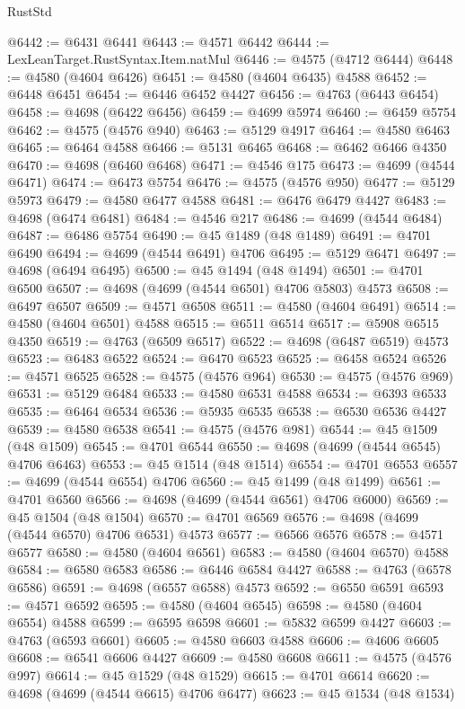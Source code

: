 \begin{lexlean}{RustStd}
\begin{coremodule}
@6442 := @6431 @6441
@6443 := @4571 @6442
@6444 := LexLeanTarget.RustSyntax.Item.natMul
@6446 := @4575 (@4712 @6444)
@6448 := @4580 (@4604 @6426)
@6451 := @4580 (@4604 @6435) @4588
@6452 := @6448 @6451
@6454 := @6446 @6452 @4427
@6456 := @4763 (@6443 @6454)
@6458 := @4698 (@6422 @6456)
@6459 := @4699 @5974
@6460 := @6459 @5754
@6462 := @4575 (@4576 @940)
@6463 := @5129 @4917
@6464 := @4580 @6463
@6465 := @6464 @4588
@6466 := @5131 @6465
@6468 := @6462 @6466 @4350
@6470 := @4698 (@6460 @6468)
@6471 := @4546 @175
@6473 := @4699 (@4544 @6471)
@6474 := @6473 @5754
@6476 := @4575 (@4576 @950)
@6477 := @5129 @5973
@6479 := @4580 @6477 @4588
@6481 := @6476 @6479 @4427
@6483 := @4698 (@6474 @6481)
@6484 := @4546 @217
@6486 := @4699 (@4544 @6484)
@6487 := @6486 @5754
@6490 := @45 @1489 (@48 @1489)
@6491 := @4701 @6490
@6494 := @4699 (@4544 @6491) @4706
@6495 := @5129 @6471
@6497 := @4698 (@6494 @6495)
@6500 := @45 @1494 (@48 @1494)
@6501 := @4701 @6500
@6507 := @4698 (@4699 (@4544 @6501) @4706 @5803) @4573
@6508 := @6497 @6507
@6509 := @4571 @6508
@6511 := @4580 (@4604 @6491)
@6514 := @4580 (@4604 @6501) @4588
@6515 := @6511 @6514
@6517 := @5908 @6515 @4350
@6519 := @4763 (@6509 @6517)
@6522 := @4698 (@6487 @6519) @4573
@6523 := @6483 @6522
@6524 := @6470 @6523
@6525 := @6458 @6524
@6526 := @4571 @6525
@6528 := @4575 (@4576 @964)
@6530 := @4575 (@4576 @969)
@6531 := @5129 @6484
@6533 := @4580 @6531 @4588
@6534 := @6393 @6533
@6535 := @6464 @6534
@6536 := @5935 @6535
@6538 := @6530 @6536 @4427
@6539 := @4580 @6538
@6541 := @4575 (@4576 @981)
@6544 := @45 @1509 (@48 @1509)
@6545 := @4701 @6544
@6550 := @4698 (@4699 (@4544 @6545) @4706 @6463)
@6553 := @45 @1514 (@48 @1514)
@6554 := @4701 @6553
@6557 := @4699 (@4544 @6554) @4706
@6560 := @45 @1499 (@48 @1499)
@6561 := @4701 @6560
@6566 := @4698 (@4699 (@4544 @6561) @4706 @6000)
@6569 := @45 @1504 (@48 @1504)
@6570 := @4701 @6569
@6576 := @4698 (@4699 (@4544 @6570) @4706 @6531) @4573
@6577 := @6566 @6576
@6578 := @4571 @6577
@6580 := @4580 (@4604 @6561)
@6583 := @4580 (@4604 @6570) @4588
@6584 := @6580 @6583
@6586 := @6446 @6584 @4427
@6588 := @4763 (@6578 @6586)
@6591 := @4698 (@6557 @6588) @4573
@6592 := @6550 @6591
@6593 := @4571 @6592
@6595 := @4580 (@4604 @6545)
@6598 := @4580 (@4604 @6554) @4588
@6599 := @6595 @6598
@6601 := @5832 @6599 @4427
@6603 := @4763 (@6593 @6601)
@6605 := @4580 @6603 @4588
@6606 := @4606 @6605
@6608 := @6541 @6606 @4427
@6609 := @4580 @6608
@6611 := @4575 (@4576 @997)
@6614 := @45 @1529 (@48 @1529)
@6615 := @4701 @6614
@6620 := @4698 (@4699 (@4544 @6615) @4706 @6477)
@6623 := @45 @1534 (@48 @1534)

\end{coremodule}
\end{lexlean}
